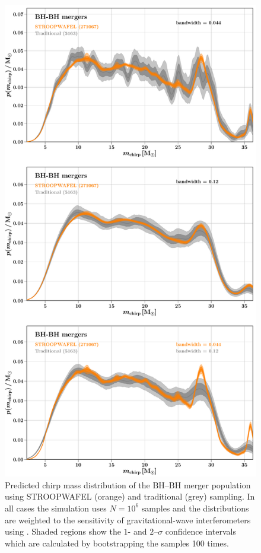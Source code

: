 \documentclass[a4paper,fleqn,usenatbib,useAMS,usedcolumn]{mnras}
\newcommand{\AISs}{\textsc{STROOPWAFEL}}
\begin{document}
%
\begin{figure}
	\includegraphics[width=\columnwidth]{Mchirp_kdeBHBH_bwVariations.pdf}
    \caption{Predicted chirp mass distribution of the   BH--BH merger population using \AISs{} (orange) and traditional (grey) sampling. In all cases the simulation uses $N= 10^6$ samples and the distributions are weighted to the sensitivity of gravitational-wave interferometers using   \citet{2017ApJ...851L..25F}. Shaded regions show the  $1$- and $2$--$\sigma$ confidence intervals which are calculated by bootstrapping the samples 100 times. 
}
\end{figure}
\end{document}
